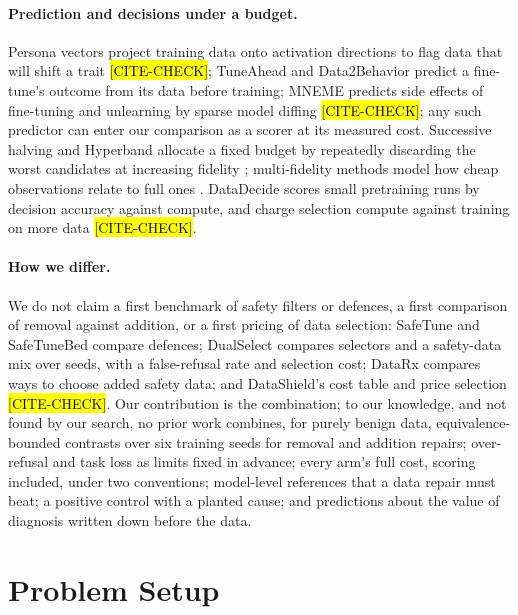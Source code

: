 \documentclass{article}
\theoremstyle{plain}
\theoremstyle{definition}
\theoremstyle{remark}
\newcommand{\ph}[1]{\hl{#1}}
\begin{document}
\paragraph{Prediction and decisions under a budget.}
Persona vectors \citep{chen2025persona} project training data onto activation
directions to flag data that will shift a trait \ph{[CITE-CHECK]}; TuneAhead
\citep{luo2026tuneahead} and Data2Behavior \citep{wang2026data2behavior}
predict a fine-tune's outcome from its data before training; MNEME predicts
side effects of fine-tuning and unlearning by sparse model diffing
\citep{kassem2025mneme} \ph{[CITE-CHECK]}; any such predictor can enter our
comparison as a scorer at its measured cost. Successive halving and Hyperband
allocate a fixed budget by repeatedly discarding the worst candidates at
increasing fidelity \citep{jamieson2016nonstochastic,li2018hyperband};
multi-fidelity methods model how cheap observations relate to full ones
\citep[e.g.][]{ouyang2025admire}. DataDecide \citep{magnusson2025datadecide}
scores small pretraining runs by decision accuracy against compute, and
\citet{ivison2025large} charge selection compute against training on more data
\ph{[CITE-CHECK]}.

\paragraph{How we differ.}
We do not claim a first benchmark of safety filters or defences, a first
comparison of removal against addition, or a first pricing of data selection:
SafeTune and SafeTuneBed \citep{hossain2025safetunebed} compare defences;
DualSelect compares selectors and a safety-data mix over seeds, with a
false-refusal rate and selection cost; DataRx compares ways to choose added
safety data; and DataShield's cost table and \citet{yin2025compute} price
selection \ph{[CITE-CHECK]}. Our contribution is the combination; to our
knowledge, and not found by our search, no prior work combines, for purely
benign data, equivalence-bounded contrasts over six training seeds for removal
and addition repairs; over-refusal and task loss as limits fixed in advance;
every arm's full cost, scoring included, under two conventions; model-level
references that a data repair must beat; a positive control with a planted
cause; and predictions about the value of diagnosis written down before the
data.

\section{Problem Setup}
\label{sec:setup}
\end{document}

